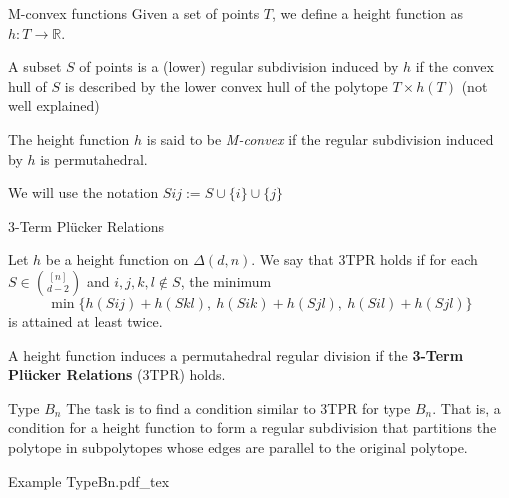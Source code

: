 \documentclass{beamer}
\newcommand{\incfig}[1]{%
\center
\def\svgwidth{0.9\columnwidth}
{#1.pdf_tex}
}
\begin{document}
\begin{frame}{M-convex functions}
Given a set of points $T$, we define a height function as  $h:T \to \mathbb{R}$.

\begin{definition}
A subset $S$ of points is a (lower) regular subdivision induced by $h$ if the convex hull of $S$ is described by the lower convex hull of the polytope $T\times h(T)$ (not well explained)
\end{definition}

\begin{definition}
The height function $h$ is said to be \textit{M-convex} if the regular subdivision induced by $h$ is permutahedral.
\end{definition}

We will use the notation $Sij := S\cup \{i\}\cup \{j\}$

\end{frame}

\begin{frame}{3-Term Plücker Relations}

\begin{definition} Let $h $ be a height function on $\Delta(d, n)$.
We say that 3TPR holds if for each $S\in \binom{[n]}{ d-2}$ and $i, j, k, l \not\in S$, the minimum
\[
\min \Big\{h(Sij) + h(Skl), \ h(Sik) + h(Sjl),\  h(Sil) +  h(Sjl)\Big\}
\] 
is attained at least twice.
\end{definition}

\begin{theorem}[] A height function induces a permutahedral regular division if the \textbf{3-Term Plücker Relations} (3TPR) holds.
\end{theorem}
\end{frame}
  

\begin{frame}{Type $B_n$}
 The task is to find a condition similar to 3TPR for type $B_n$. That is, a condition for a height function to form a regular subdivision that partitions the polytope in subpolytopes whose edges are parallel to the original polytope. 
 \begin{block}{Example}
  \incfig{TypeBn} 
 \end{block}
\end{frame}
\end{document}
